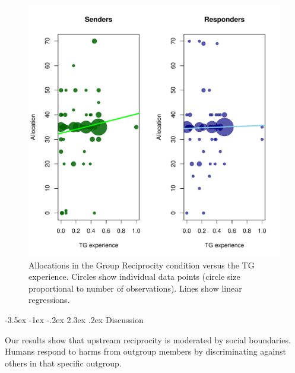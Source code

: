 \documentclass[12pt,a4paper]{article}\usepackage[]{graphicx}\usepackage[]{color}
\makeatletter
\def\maxwidth{ %
  \ifdim\Gin@nat@width>\linewidth
    \linewidth
  \else
    \Gin@nat@width
  \fi
}
\newenvironment{knitrout}{}{} %
\renewcommand\section{\@startsection {section}{1}{\z@}%
{-3.5ex \@plus -1ex \@minus -.2ex}%
{2.3ex \@plus.2ex}%
{\bf\sffamily\Large}}
\makeatother
\begin{document}
\begin{knitrout}
\color{fgcolor}\begin{figure}
\includegraphics[width=\maxwidth]{plots-1} \caption[Allocations in the Group Reciprocity condition versus the TG experience]{Allocations in the Group Reciprocity condition versus the TG experience. Circles show individual data points (circle size proportional to number of observations). Lines show linear regressions.}\label{fig:plots}
\end{figure}


\end{knitrout}

\section{Discussion}
\label{sec:conclusion}

Our results show that upstream reciprocity is moderated by social boundaries.
Humans respond to harms from outgroup members by discriminating against others
in that specific outgroup.
\end{document}
